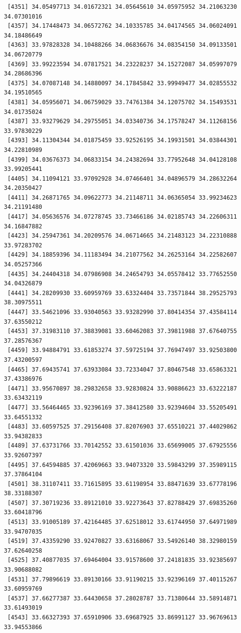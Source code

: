 \documentclass[
  letterpaper,
  DIV=11,
  numbers=noendperiod]{scrartcl}
\begin{document}
\begin{verbatim}
 [4351] 34.05497713 34.01672321 34.05645610 34.05975952 34.21063230 34.07301016
 [4357] 34.17448473 34.06572762 34.10335785 34.04174565 34.06024091 34.18486649
 [4363] 33.97828328 34.10488266 34.06836676 34.08354150 34.09133501 34.06720779
 [4369] 33.99223594 34.07817521 34.23228237 34.15272087 34.05997079 34.28686396
 [4375] 34.07087148 34.14880097 34.17845842 33.99949477 34.02855532 34.19510565
 [4381] 34.05956071 34.06759029 33.74761384 34.12075702 34.15493531 34.01735024
 [4387] 33.93279629 34.29755051 34.03340736 34.17578247 34.11268156 33.97830229
 [4393] 34.11304344 34.01875459 33.92526195 34.19931501 34.03844301 34.22810989
 [4399] 34.03676373 34.06833154 34.24382694 33.77952648 34.04128108 33.99205441
 [4405] 34.11094121 33.97092928 34.07466401 34.04896579 34.28632264 34.20350427
 [4411] 34.26871765 34.09622773 34.21148711 34.06365054 33.99234623 34.21191480
 [4417] 34.05636576 34.07278745 33.73466186 34.02185743 34.22606311 34.16847882
 [4423] 34.25947361 34.20209576 34.06714665 34.21483123 34.22310888 33.97283702
 [4429] 34.18859396 34.11183494 34.21077562 34.26253164 34.22582607 34.05257366
 [4435] 34.24404318 34.07986908 34.24654793 34.05578412 33.77652550 34.04326879
 [4441] 34.28209930 33.60959769 33.63324404 33.73571844 38.29525793 38.30975511
 [4447] 33.54621096 33.93040563 33.93282990 37.80414354 37.43584114 37.63550212
 [4453] 37.31983110 37.38839081 33.60462083 37.39811988 37.67640755 37.28576367
 [4459] 33.94884791 33.61853274 37.59725194 37.76947497 33.92503800 37.43200597
 [4465] 37.69435741 37.63933084 33.72334047 37.80467548 33.65863321 37.43386976
 [4471] 33.95670897 38.29832658 33.92830824 33.90886623 33.63222187 33.63432119
 [4477] 33.56464465 33.92396169 37.38412580 33.92394604 33.55205491 33.64551332
 [4483] 33.60597525 37.29156408 37.82076903 37.65510221 37.44029862 33.94382833
 [4489] 37.63731766 33.70142552 33.61501036 33.65699005 37.67925556 33.92607397
 [4495] 37.64594885 37.42069663 33.94073320 33.59843299 37.35989115 37.37864104
 [4501] 38.31107411 33.71615895 33.61198954 33.88471639 33.67778196 38.33188307
 [4507] 37.30719236 33.89121010 33.92273643 37.82788429 37.69835260 33.60418796
 [4513] 33.91005189 37.42164485 37.62518012 33.61744950 37.64971989 33.94707035
 [4519] 37.43359290 33.92470827 33.63168067 33.54926140 38.32980159 37.62640258
 [4525] 37.40877035 37.69464004 33.91578600 37.24181835 33.92385697 33.90688082
 [4531] 37.79896619 33.89130166 33.91190215 33.92396169 37.40115267 33.60959769
 [4537] 37.66277387 33.64430658 37.28028787 33.71380644 33.58914871 33.61493019
 [4543] 33.66327393 37.65910906 33.69687925 33.86991127 33.96769613 33.94553866

\end{verbatim}
\end{document}
